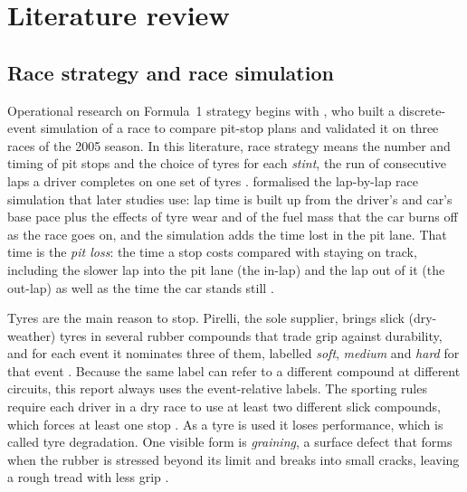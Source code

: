 \documentclass[12pt]{article}
\begin{document}
\section{Literature review}\label{sec:lit}

\subsection{Race strategy and race simulation}\label{sec:lit-strategy}

Operational research on Formula~1 strategy begins with \textcite{bekker2009}, who built a discrete-event simulation of
a race to compare pit-stop plans and validated it on three races of the 2005 season. In this literature, race strategy
means the number and timing of pit stops and the choice of tyres for each \emph{stint}, the run of consecutive laps a
driver completes on one set of tyres \parencite{heilmeier2020vse}. \textcite{heilmeier2018} formalised the lap-by-lap
race simulation that later studies use: lap time is built up from the driver's and car's base pace plus the effects of
tyre wear and of the fuel mass that the car burns off as the race goes on, and the simulation adds the time lost in the
pit lane. That time is the \emph{pit loss}: the time a stop costs compared with staying on track, including the slower
lap into the pit lane (the in-lap) and the lap out of it (the out-lap) as well as the time the car stands still
\parencite{heilmeier2020mc}.

Tyres are the main reason to stop. Pirelli, the sole supplier, brings slick (dry-weather) tyres in several rubber
compounds that trade grip against durability, and for each event it nominates three of them, labelled \emph{soft},
\emph{medium} and \emph{hard} for that event \parencite{pirelli_tyres,pirelli_choice}. Because the same label can refer to
a different compound at different circuits, this report always uses the event-relative labels. The sporting rules
require each driver in a dry race to use at least two different slick compounds, which forces at least one stop
\parencite{pirelli_tyres,f1_monaco_rule}. As a tyre is used it loses performance, which is called tyre degradation. One
visible form is \emph{graining}, a surface defect that forms when the rubber is stressed beyond its limit and breaks
into small cracks, leaving a rough tread with less grip \parencite{pirelli_graining}.
\end{document}
